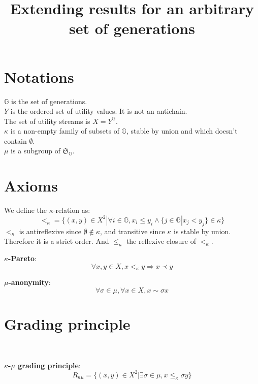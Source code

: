 \documentclass{article}
\title{Extending results for an arbitrary set of generations}
\author{}
\newcommand{\G}{\mathbb{G}}
\begin{document}
\maketitle

\section{Notations}

$\G$ is the set of generations. \\
$Y$ is the ordered set of utility values. It is not an antichain.\\
The set of utility streams is $X=Y^\G$.\\
$\kappa$ is a non-empty family of subsets of $\G$, stable by union and which doesn't
contain $\emptyset$. \\
$\mu$ is a subgroup of $\mathfrak{S}_\G$.

\section{Axioms}

We define the $\kappa$-relation as:
\[<_\kappa = \{(x,y)\in X^2|\forall i\in \G, x_i \leq y_i \land
\{j \in \G | x_j < y_j\}\in\kappa\}\]
$<_\kappa$ is antireflexive since $\emptyset\not\in\kappa$,
and transitive since $\kappa$ is stable by union. Therefore it is a strict order.
And $\leq_\kappa$ the reflexive closure of $<_\kappa$.\smallskip\par

\textbf{$\kappa$-Pareto}:
\[\forall x,y\in X, x <_\kappa y \Rightarrow x \prec y\]

\textbf{$\mu$-anonymity}:
\[\forall\sigma\in\mu,\forall x\in X, x \sim \sigma x\]

\section{Grading principle}
\ \par
\textbf{$\kappa$-$\mu$ grading principle}:
\[R_{\kappa\mu} = \{(x,y)\in X^2 | \exists\sigma\in\mu, x \leq_\kappa \sigma y\}\]
\end{document}
